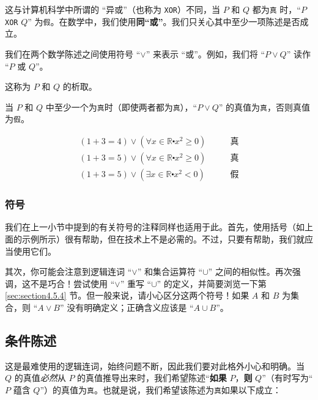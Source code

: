这与计算机科学中所谓的 ``异或''（也称为 \verb|XOR|）不同，当 $P$ 和 $Q$ 都为\verb|真| 时，``$P$ \verb|XOR| $Q$'' 为\verb|假|。在数学中，我们使用\textbf{同``或''}。我们只关心其中至少一项陈述是否成立。

\begin{definition}
    我们在两个数学陈述之间使用符号 ``$\lor$'' 来表示 ``或''。例如，我们将 ``$P \lor Q$'' 读作 ``$P$ 或 $Q$''。

    这称为 $P$ 和 $Q$ 的析取。

    当 $P$ 和 $Q$ 中至少一个为\verb|真|时（即使两者都为\verb|真|），``$P \lor Q$'' 的真值为\verb|真|，否则真值为\verb|假|。
\end{definition}

\begin{example}
    \begin{align*}
        (1 + 3 = 4) \lor (\forall x \in \mathbb{R} \centerdot x^2 \ge 0) \qquad &\text{真} \\
        (1 + 3 = 5) \lor (\forall x \in \mathbb{R} \centerdot x^2 \ge 0) \qquad &\text{真} \\
        (1 + 3 = 5) \lor (\exists x \in \mathbb{R} \centerdot x^2 < 0)   \qquad &\text{假}
    \end{align*}
\end{example}

\subsubsection*{符号}

我们在上一小节中提到的有关符号的注释同样也适用于此。首先，使用括号（如上面的示例所示）很有帮助，但在技术上不是必需的。不过，只要有帮助，我们就应当使用它们。

其次，你可能会注意到逻辑连词 ``$\lor$'' 和集合运算符 ``$\cup$'' 之间的相似性。再次强调，这不是巧合！尝试使用 ``$\lor$'' 重写 ``$\cup$'' 的定义，并简要浏览一下第 \ref{sec:section4.5.4} 节。但一般来说，请小心区分这两个符号！如果 $A$ 和 $B$ 为集合，则 ``$A \lor B$'' 没有明确定义；正确含义应该是 ``$A \cup B$''。

\subsection{条件陈述}\label{sec:section4.5.3}

这是最难使用的逻辑连词，始终问题不断，因此我们要对此格外小心和明确。当 $Q$ 的真值\emph{必然}从 $P$ 的真值推导出来时，我们希望陈述``\textbf{如果} $P$，\textbf{则} $Q$''（有时写为``$P$ 蕴含 $Q$''）的真值为\verb|真|。也就是说，我们希望该陈述为\verb|真|如果以下成立：

